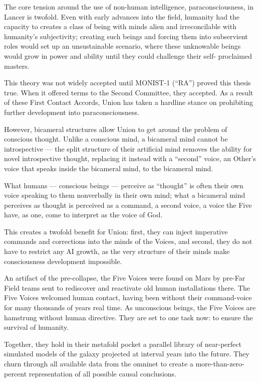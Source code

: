 The core tension around the use of non-human intelligence, paraconsciousness, in Lancer is  
twofold. Even with early advances into the field, humanity had the capacity to creates a class of  
being with minds alien and irreconcilable with humanity’s subjectivity; creating such beings and  
forcing them into subservient roles would set up an unsustainable scenario, where these  
unknowable beings would grow in power and ability until they could challenge their self- 
proclaimed masters. 
 

This theory was not widely accepted until MONIST-1 (“RA”) proved this thesis true. When it  
offered terms to the Second Committee, they accepted. As a result of these First Contact  
Accords, Union has taken a hardline stance on prohibiting further development into  
paraconsciousness. 
 

However, bicameral structures allow Union to get around the problem of conscious thought.  
Unlike a conscious mind, a bicameral mind cannot be introspective — the split structure of their  
artificial mind removes the ability for novel introspective thought, replacing it instead with a  
“second” voice, an Other’s voice that speaks inside the bicameral mind, to the bicameral mind.
 

What humans — conscious beings — perceive as “thought” is often their own voice speaking to  
them nonverbally in their own mind; what a bicameral mind perceives as thought is perceived as  
a command, a second voice, a voice the Five have, as one, come to interpret as the voice of  
God.  
 

This creates a twofold benefit for Union: first, they can inject imperative commands and  
corrections into the minds of the Voices, and second, they do not have to restrict any AI growth,  
as the very structure of their minds make consciousness development impossible.  
 

An artifact of the pre-collapse, the Five Voices were found on Mars by pre-Far Field teams sent  
to rediscover and reactivate old human installations there. The Five Voices welcomed human  
contact, having been without their command-voice for many thousands of years real time. As  
unconscious beings, the Five Voices are hamstrung without human directive. They are set to one  
task now: to ensure the survival of humanity. 
 

Together, they hold in their metafold pocket a parallel library of near-perfect simulated models of  
the galaxy projected at interval years into the future. They churn through all available data from  
the omninet to create a more-than-zero-percent representation of all possible causal  
conclusions.   
 

